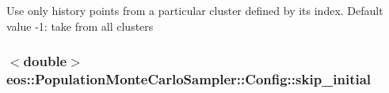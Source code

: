 \label{structeos_1_1PopulationMonteCarloSampler_1_1Config_a2a6f2098dc8be089015818326d8eb15f}
Use only history points from a particular cluster defined by its index. Default value -\/1: take from all clusters \hypertarget{structeos_1_1PopulationMonteCarloSampler_1_1Config_ac920d732b229713ca67428d284390fa2}{
\subsubsection[{skip\_\-initial}]{$<$double$>$ {\bf eos::PopulationMonteCarloSampler::Config::skip\_\-initial}}}
\label{structeos_1_1PopulationMonteCarloSampler_1_1Config_ac920d732b229713ca67428d284390fa2}


